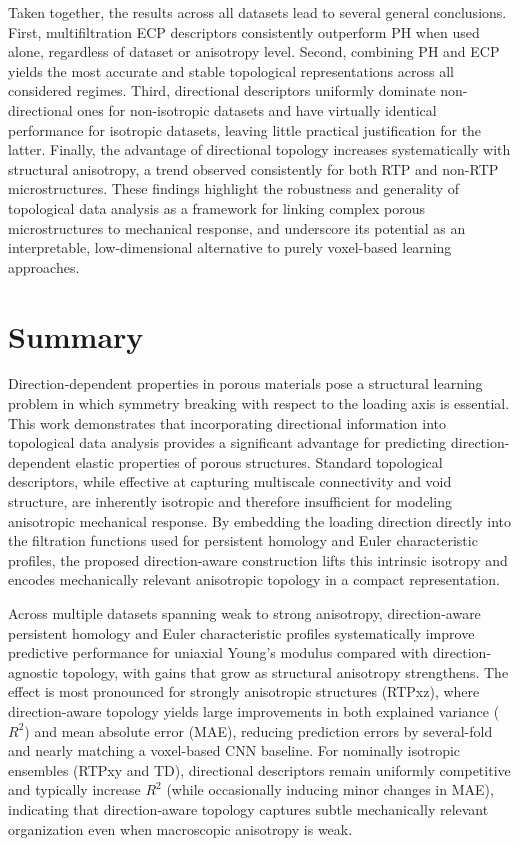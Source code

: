 \documentclass[sn-mathphys,Numbered]{sn-jnl}
\theoremstyle{definition}
\begin{document}
Taken together, the results across all datasets lead to several general
conclusions.
First, multifiltration ECP descriptors consistently outperform PH when used
alone, regardless of dataset or anisotropy level.
Second, combining PH and ECP yields the most accurate and stable topological
representations across all considered regimes.
Third, directional descriptors uniformly dominate non-directional ones for non-isotropic datasets and have virtually identical performance for isotropic datasets, leaving little practical justification for
the latter.
Finally, the advantage of directional topology increases systematically with
structural anisotropy, a trend observed consistently for both RTP and non-RTP
microstructures.
These findings highlight the robustness and generality of topological data
analysis as a framework for linking complex porous microstructures to
mechanical response, and underscore its potential as an interpretable,
low-dimensional alternative to purely voxel-based learning approaches.


\section{Summary}
\label{sec:summary}

Direction-dependent properties in porous materials pose a structural learning problem in which symmetry breaking with respect to the loading axis is essential. This work demonstrates that incorporating directional information into topological data analysis provides a significant advantage for predicting direction-dependent elastic properties of porous structures. Standard topological descriptors, while effective at capturing multiscale connectivity and void structure, are inherently isotropic and therefore insufficient for modeling anisotropic mechanical response. By embedding the loading direction directly into the filtration functions used for persistent homology and Euler characteristic profiles, the proposed direction-aware construction lifts this intrinsic isotropy and encodes mechanically relevant anisotropic topology in a compact representation.

Across multiple datasets spanning weak to strong anisotropy, direction-aware persistent homology and Euler characteristic profiles systematically improve predictive performance for uniaxial Young’s modulus compared with direction-agnostic topology, with gains that grow as structural anisotropy strengthens. The effect is most pronounced for strongly anisotropic structures (RTPxz), where direction-aware topology yields large improvements in both explained variance ($R^2$) and mean absolute error (MAE), reducing prediction errors by several-fold and nearly matching a voxel-based CNN baseline. For nominally isotropic ensembles (RTPxy and TD), directional descriptors remain uniformly competitive and typically increase $R^2$ (while occasionally inducing minor changes in MAE), indicating that direction-aware topology captures subtle mechanically relevant organization even when macroscopic anisotropy is weak.
\end{document}
